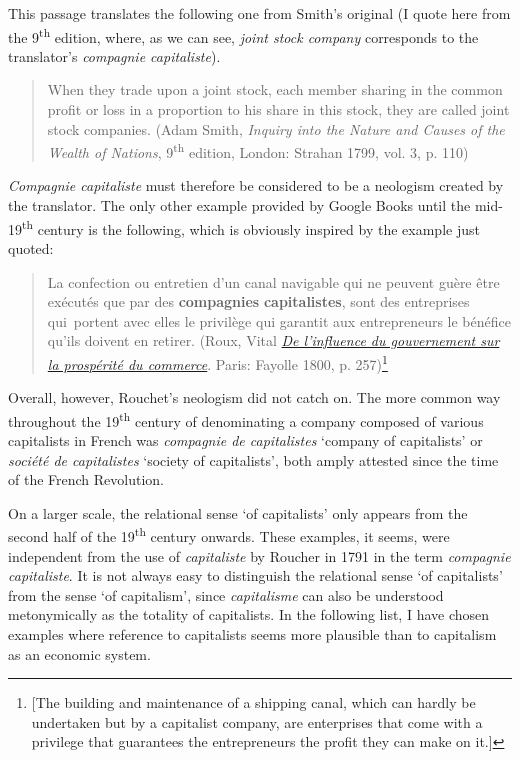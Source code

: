 \documentclass[output=paper]{langsci/langscibook}
\begin{document}
This passage translates the following one from Smith's original (I 
quote here from the 9\textsuperscript{th} edition, where, as we can see, \emph{joint stock company}
corresponds to the translator's \emph{compagnie capitaliste}).

\begin{quote}
When they trade upon a joint stock, each member sharing in the common
profit or loss in a proportion to his share in this stock, they are
called joint stock companies.
(Adam Smith, \emph{Inquiry into
the Nature and Causes of the Wealth of Nations}, 9\textsuperscript{th} edition, London: Strahan 1799, vol.
3, p. 110)

\end{quote}

\emph{Compagnie capitaliste} must therefore be considered to be a
neologism created by the translator. The only other example provided by
Google Books until the mid-19\textsuperscript{th} century is the
following, which is obviously inspired by the example just quoted:

\begin{quote}
La confection ou entretien d'un canal navigable qui ne peuvent guère
être exécutés que par des \textbf{compagnies} \textbf{capitalistes},
sont des entreprises qui~portent avec elles le privilège qui garantit
aux entrepreneurs le bénéfice qu'ils doivent en retirer. (Roux, Vital
\href{https://books.google.at/books?id=H6xaAAAAYAAJ\&pg=PA257\&dq=\%
22capitalistes\%22\&hl=de\&sa=X\&ved=
0ahUKEwij7Ou8xpTOAhUrCsAKHS4aBdk4FBDoAQhEMAU}{\emph{De
l'influence du gouvernement sur la prospérité du commerce}}. Paris:
Fayolle 1800, p. 257)\footnote{{[}The building and maintenance of a
  shipping canal, which can hardly be undertaken but by a capitalist
  company, are enterprises that come with a privilege that guarantees
  the entrepreneurs the profit they can make on it.{]}}
\end{quote}

Overall, however, Rouchet's neologism did not catch on. The more common
way throughout the 19\textsuperscript{th} century of denominating a
company composed of various capitalists in French was \emph{compagnie de
capitalistes} `company of capitalists' or \emph{société de capitalistes}
`society of capitalists', both amply attested since the time of the
French Revolution.

On a larger scale, the relational sense `of capitalists' only appears
from the second half of the 19\textsuperscript{th} century onwards.
These examples, it seems, were independent from the use of
\emph{capitaliste} by Roucher in 1791 in the term \emph{compagnie
capitaliste}. It is not always easy to distinguish the relational sense
`of capitalists' from the sense `of capitalism', since
\emph{capitalisme} can also be understood metonymically as the totality
of capitalists. In the following list, I have chosen examples
where reference to capitalists seems more plausible than to capitalism
as an economic system.
\end{document}
